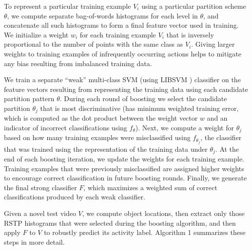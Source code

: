 \documentclass[12pt]{article} %
\begin{document}
  To represent a particular training example $V_i$ using a particular
  partition scheme $\theta$, we compute separate bag-of-words histograms for
  each level in $\theta$, and concatenate all such histograms to form a
  final feature vector used in training.
  We initialize a weight
  $w_i$ for each
	training example $V_i$ that is inversely proportional to the number of points
	with the same class as $V_i$. Giving larger weights to training examples of
  infrequently occurring actions helps to mitigate any bias resulting from imbalanced
  training data.
  
  We train a separate ``weak''
  multi-class SVM 
  (using LIBSVM \cite{Chang11})
	classifier on the feature vectors resulting from representing the training
	data using each candidate partition pattern $\theta$.   During each round of boosting we select the
	candidate partition $\theta_j$ that is most discriminative (has minimum
  weighted training
	error, which is computed as the dot product between the weight vector $w$
  and an indicator of incorrect classifications using $f_\theta$).
  Next, we compute a weight for $\theta_j$ based on how many training
  examples were misclassified using $f_{\theta_j}$, the classifier
  that was trained using the representation of the training data under
  $\theta_j$.
  At the end of each boosting iteration, we update the weights for each
  training example. Training examples that were previously misclassified are
  assigned higher weights to encourage correct classification in future
  boosting rounds.
  Finally, we generate the 
	final strong classifier $F$, which maximizes a weighted
  sum of correct classifications produced by each weak classifier.

  Given a novel test video $V$, we compute object locations, then extract only those
  RSTP histograms that were selected during the boosting algorithm, and then
  apply $F$ to $V$ to robustly predict its activity label. Algorithm 1 summarizes
  these steps in more detail.\\
  
\end{document}
